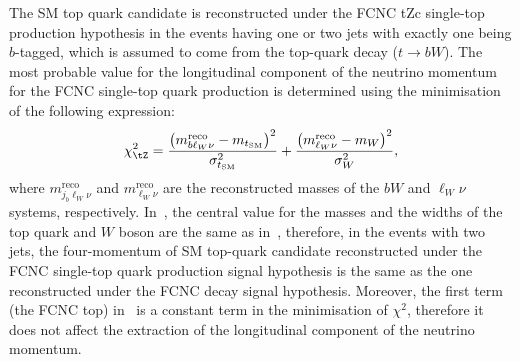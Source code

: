 The SM top quark candidate is reconstructed under the FCNC tZc single-top production hypothesis in the events having one or two jets with exactly one being $b$-tagged, which is assumed to come from the top-quark decay ($t\to bW$). 
The most probable value for the longitudinal component of the neutrino momentum for the FCNC single-top quark production is determined using the minimisation of the following expression:
\begin{equation}
\chi^2_{\tZ}  = 
\frac{\left(m^{\mathrm{reco}}_{b\ell_W\nu}-m_{t_{\mathrm{SM}}}\right)^2}{\sigma_{t_{\mathrm{SM}}}^2}
+ \frac{\left(m^{\mathrm{reco}}_{\ell_W\nu}-m_W\right)^2}{\sigma_W^2},
\label{eq:chi2tZ}
\end{equation}
where $m^{\mathrm{reco}}_{j_b\ell_W\nu}$ and $m^{\mathrm{reco}}_{\ell_W\nu}$ are 
the reconstructed masses of the $bW$ and $\ell_W\nu$ systems, respectively.
In~, the central value for the masses and the widths
of the top quark and $W$ boson are the same as in~, therefore, in the events with two jets,
the four-momentum of SM top-quark candidate reconstructed under the FCNC single-top quark
production signal hypothesis is the same as the one reconstructed under the FCNC \ttbar decay signal hypothesis. 
Moreover, the first term (the FCNC top) in~ is a constant term in the minimisation of $\chi^{2}$, therefore it does not affect the extraction of the longitudinal component of the neutrino momentum.


